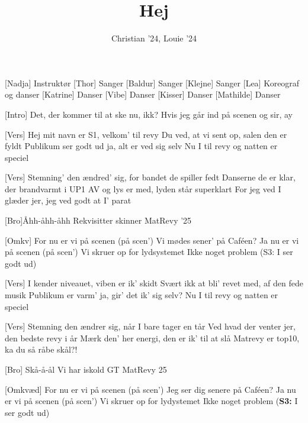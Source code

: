 \documentclass[a4paper,11pt]{article}
\title{Hej}
\author{Christian '24, Louie '24}
\begin{document}
\maketitle

\begin{roles}
[Nadja] Instruktør
[Thor] Sanger
[Baldur] Sanger
[Klejne] Sanger 
[Lea] Koreograf og danser
[Katrine] Danser
[Vibe] Danser
[Kisser] Danser
[Mathilde] Danser
\end{roles}

\begin{song}
[Intro] Det, der kommer til at ske nu, ikk?
Hvis jeg går ind på scenen og sir, ay

[Vers] Hej mit navn er S1, velkom’ til revy
Du ved, at vi sent op, salen den er fyldt
Publikum ser godt ud ja, alt er ved sig selv
Nu I til revy og natten er speciel

[Vers] Stemning’ den ændred’ sig, for bandet de spiller fedt
Danserne de er klar, der brandvarmt i UP1
AV og lys er med, lyden står superklart
For jeg ved I glæder jer, jeg ved godt at I’ parat

[Bro]Åhh-åhh-åhh
Rekvisitter skinner
MatRevy ’25

[Omkv] For nu er vi på scenen (på scen’)
Vi mødes sener’ på Caféen?
Ja nu er vi på scenen (på scen’)
Vi skruer op for lydsystemet
Ikke noget problem (S3: I ser godt ud)

[Vers] 
I kender niveauet, viben er ik' skidt
Svært ikk at bli' revet med, af den fede musik
Publikum er varm’ ja, gir' det ik' sig selv?
Nu I til revy og natten er speciel

[Vers] Stemning den ændrer sig, når I bare tager en tår
Ved hvad der venter jer, den bedste revy i år
Mærk den’ her energi, den er ik' til at slå
Matrevy er top10, ka du så råbe skål?!

[Bro] Skå-å-ål
Vi har iskold GT
MatRevy 25

[Omkvæd] For nu er vi på scenen (på scen’)
Jeg ser dig senere på Caféen?
Ja nu er vi på scenen (på scen’)
Vi skruer op for lydystemet
Ikke noget problem (\textbf{S3:} I ser godt ud)

  
\end{song}
\end{document}
